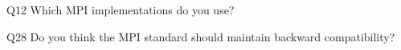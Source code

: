 \begin{description}%
\item{Q12} Which MPI implementations do you use?%
\item{Q28} Do you think the MPI standard should maintain backward compatibility?%
\end{description}%
